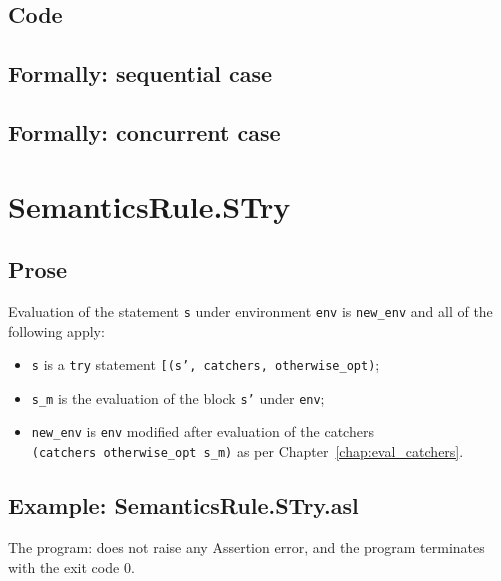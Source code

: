 \documentclass{book}
\begin{document}
  \subsection{Code}

\begin{emptyformal}
  \subsection{Formally: sequential case}

  \subsection{Formally: concurrent case}
\end{emptyformal}


\section{SemanticsRule.STry \label{sec:SemanticsRule.STry}}

    \subsection{Prose}
  Evaluation of the statement \texttt{s} under environment \texttt{env} is
\texttt{new\_env} and all of the following apply:
    \begin{itemize}
    \item \texttt{s} is a \texttt{try} statement \texttt{[(s', catchers, otherwise\_opt)};
    \item \texttt{s\_m} is the evaluation of the block \texttt{s'} under \texttt{env};
    \item \texttt{new\_env} is \texttt{env} modified after evaluation of the
catchers \\ \texttt{(catchers otherwise\_opt s\_m)} as per
Chapter~\ref{chap:eval_catchers}.  
    \end{itemize}

    \subsection{Example: SemanticsRule.STry.asl}
    The program:
    does not raise any Assertion error, and the program terminates with the exit code 0.
\end{document}
